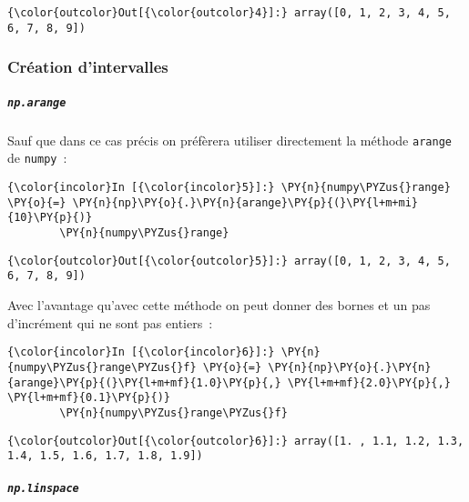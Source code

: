 \begin{Verbatim}[commandchars=\\\{\}]
{\color{outcolor}Out[{\color{outcolor}4}]:} array([0, 1, 2, 3, 4, 5, 6, 7, 8, 9])
\end{Verbatim}
            
    \hypertarget{cruxe9ation-dintervalles}{%
\subsubsection{Création d'intervalles}\label{cruxe9ation-dintervalles}}

    \hypertarget{np.arange}{%
\subparagraph{\texorpdfstring{\texttt{np.arange}}{np.arange}}\label{np.arange}}

    Sauf que dans ce cas précis on préfèrera utiliser directement la méthode
\texttt{arange} de \texttt{numpy}~:

    \begin{Verbatim}[commandchars=\\\{\}]
{\color{incolor}In [{\color{incolor}5}]:} \PY{n}{numpy\PYZus{}range} \PY{o}{=} \PY{n}{np}\PY{o}{.}\PY{n}{arange}\PY{p}{(}\PY{l+m+mi}{10}\PY{p}{)}
        \PY{n}{numpy\PYZus{}range}
\end{Verbatim}


\begin{Verbatim}[commandchars=\\\{\}]
{\color{outcolor}Out[{\color{outcolor}5}]:} array([0, 1, 2, 3, 4, 5, 6, 7, 8, 9])
\end{Verbatim}
            
    Avec l'avantage qu'avec cette méthode on peut donner des bornes et un
pas d'incrément qui ne sont pas entiers~:

    \begin{Verbatim}[commandchars=\\\{\}]
{\color{incolor}In [{\color{incolor}6}]:} \PY{n}{numpy\PYZus{}range\PYZus{}f} \PY{o}{=} \PY{n}{np}\PY{o}{.}\PY{n}{arange}\PY{p}{(}\PY{l+m+mf}{1.0}\PY{p}{,} \PY{l+m+mf}{2.0}\PY{p}{,} \PY{l+m+mf}{0.1}\PY{p}{)}
        \PY{n}{numpy\PYZus{}range\PYZus{}f}
\end{Verbatim}


\begin{Verbatim}[commandchars=\\\{\}]
{\color{outcolor}Out[{\color{outcolor}6}]:} array([1. , 1.1, 1.2, 1.3, 1.4, 1.5, 1.6, 1.7, 1.8, 1.9])
\end{Verbatim}
            
    \hypertarget{np.linspace}{%
\subparagraph{\texorpdfstring{\texttt{np.linspace}}{np.linspace}}\label{np.linspace}}

